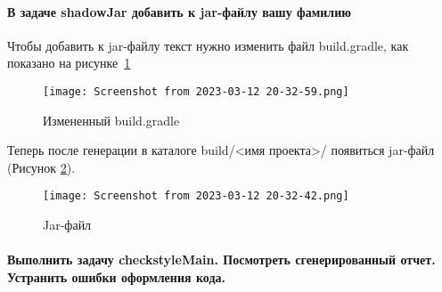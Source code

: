 \paragraph{В задаче shadowJar добавить к jar-файлу вашу фамилию}\mbox{}\par
Чтобы добавить к jar-файлу текст нужно изменить файл build.gradle, как
показано на рисунке~\ref{fig:jar:rename}

\begin{figure}[h!tp]
	\centering
	\texttt{[image: Screenshot from 2023-03-12 20-32-59.png]}
	\caption{Измененный build.gradle}
	\label{fig:jar:rename}
\end{figure}

Теперь после генерации в каталоге build/<имя проекта>/ появиться jar-файл
(Рисунок \ref{fig:jar:file}).

\begin{figure}[h!tp]
	\centering
	\texttt{[image: Screenshot from 2023-03-12 20-32-42.png]}
	\caption{Jar-файл}
	\label{fig:jar:file}
\end{figure}

\paragraph{Выполнить задачу checkstyleMain. Посмотреть сгенерированный отчет.
Устранить ошибки оформления кода.}\mbox{}\par

